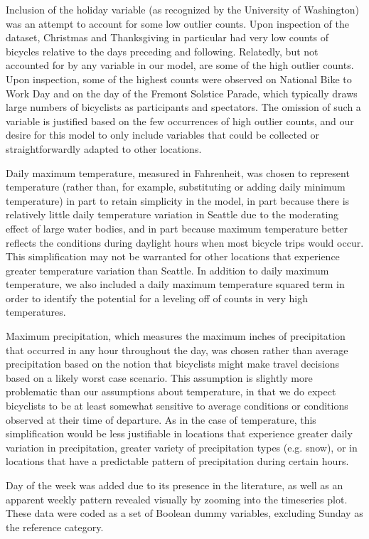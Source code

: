 \documentclass[12pt,letterpaper,article]{memoir}
\begin{document}
Inclusion of the holiday variable (as recognized by the University of
Washington) was an attempt to account for some low outlier
counts. Upon inspection of the dataset, Christmas and Thanksgiving in
particular had very low counts of bicycles relative to the days
preceding and following. Relatedly, but not accounted for by any
variable in our model, are some of the high outlier counts. Upon
inspection, some of the highest counts were observed on National Bike
to Work Day and on the day of the Fremont Solstice Parade, which
typically draws large numbers of bicyclists as participants and
spectators. The omission of such a variable is justified based on the
few occurrences of high outlier counts, and our desire for this model
to only include variables that could be collected or straightforwardly
adapted to other locations.

Daily maximum temperature, measured in Fahrenheit, was chosen to
represent temperature (rather than, for example, substituting or
adding daily minimum temperature) in part to retain simplicity in the
model, in part because there is relatively little daily temperature
variation in Seattle due to the moderating effect of large water
bodies, and in part because maximum temperature better reflects the
conditions during daylight hours when most bicycle trips would occur.
This simplification may not be warranted for other locations that
experience greater temperature variation than Seattle. In addition to
daily maximum temperature, we also included a daily maximum
temperature squared term in order to identify the potential for a
leveling off of counts in very high temperatures.

Maximum precipitation, which measures the maximum inches of
precipitation that occurred in any hour throughout the day, was chosen
rather than average precipitation based on the notion that bicyclists
might make travel decisions based on a likely worst case scenario.
This assumption is slightly more problematic than our assumptions
about temperature, in that we do expect bicyclists to be at least
somewhat sensitive to average conditions or conditions observed at
their time of departure. As in the case of temperature, this
simplification would be less justifiable in locations that experience
greater daily variation in precipitation, greater variety of
precipitation types (e.g. snow), or in locations that have a
predictable pattern of precipitation during certain hours.

Day of the week was added due to its presence in the literature, as
well as an apparent weekly pattern revealed visually by zooming into
the timeseries plot. These data were coded as a set of Boolean dummy
variables, excluding Sunday as the reference category.
\end{document}
